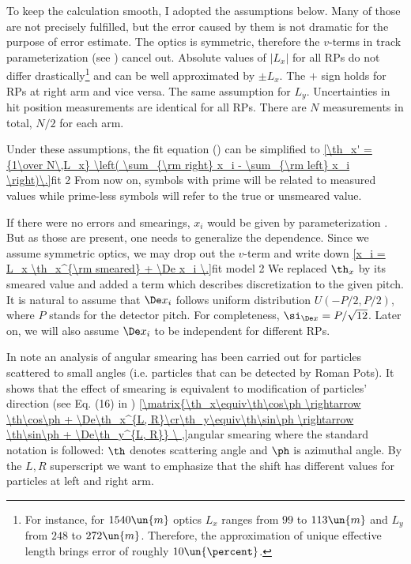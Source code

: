 To keep the calculation smooth, I adopted the assumptions below. Many of those are not precisely fulfilled, but the error caused by them is not dramatic for the purpose of error estimate.
\bitm
\itm The optics is symmetric, therefore the $v$-terms in track parameterization (see ) cancel out.
\itm Absolute values of $|L_x|$ for all RPs do not differ drastically\footnote{%
For instance, for $1540\un{m}$ optics $L_x$ ranges from $99$ to $113\un{m}$ and $L_y$ from $248$ to $272\un{m}$. Therefore, the approximation of unique effective length brings error of roughly $10\un{\percent}$.
}
and can be well approximated by $\pm L_x$. The $+$ sign holds for RPs at right arm and vice versa. The same assumption for $L_y$.
\itm Uncertainties in hit position measurements are identical for all RPs. 
\itm There are $N$ measurements in total, $N/2$ for each arm.
\eitm

\vskip2mm
Under these assumptions, the fit equation () can be simplified to
\eqref{\th_x' = {1\over N\,L_x} \left( \sum_{\rm right} x_i - \sum_{\rm left} x_i \right)\.}{fit 2}
From now on, symbols with prime will be related to measured values while prime-less symbols will refer to the true or unsmeared value. 

If there were no errors and smearings, $x_i$ would be given by parameterization . But as those are present, one needs to generalize the dependence. Since we assume symmetric optics, we may drop out the $v$-term and write down
\eqref{x_i = L_x \th_x^{\rm smeared} + \De x_i \.}{fit model 2}
We replaced $\th_x$ by its smeared value and added a term which describes discretization to the given pitch. It is natural to assume that $\De x_i$ follows uniform distribution $U(-P/2, P/2)$, where $P$ stands for the detector pitch. For completeness, $\si_{\De x} = P / \sqrt{12}$. Later on, we will also assume $\De x_i$ to be independent for different RPs.

In note  an analysis of angular smearing has been carried out for particles scattered to small angles (i.e. particles that can be detected by Roman Pots). It shows that the effect of smearing is equivalent to modification of particles' direction (see Eq. (16) in )
\eqref{\matrix{\th_x\equiv\th\cos\ph \rightarrow \th\cos\ph + \De\th_x^{L, R}\cr\th_y\equiv\th\sin\ph \rightarrow \th\sin\ph + \De\th_y^{L, R}}  \ ,}{angular smearing}
where the standard notation is followed: $\th$ denotes scattering angle and $\ph$ is azimuthal angle. By the $L, R$ superscript we want to emphasize that the shift has different values for particles at left and right arm.

